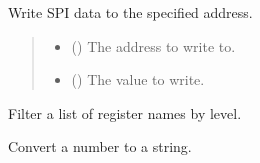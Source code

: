 \documentclass[letterpaper,10pt,english]{sphinxmanual}
\begin{document}
\begin{fulllineitems}
\begin{fulllineitems}
\end{fulllineitems}



\begin{fulllineitems}

\pysigstartsignatures
{}
\pysigstopsignatures
\sphinxAtStartPar
Write SPI data to the specified address.
\begin{quote}\begin{description}
\begin{itemize}
\item {} 
\sphinxAtStartPar
{} () \textendash{} The address to write to.

\item {} 
\sphinxAtStartPar
{} () \textendash{} The value to write.

\end{itemize}

\end{description}\end{quote}

\end{fulllineitems}


\end{fulllineitems}



\begin{fulllineitems}

\pysigstartsignatures
{}
\pysigstopsignatures
\sphinxAtStartPar
Filter a list of register names by level.

\end{fulllineitems}



\begin{fulllineitems}

\pysigstartsignatures
{}
\pysigstopsignatures
\sphinxAtStartPar
Convert a number to a string.

\end{fulllineitems}
\end{document}
